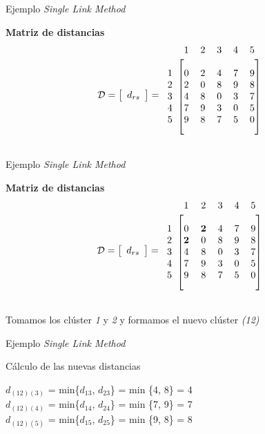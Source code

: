 \documentclass[spanish]{beamer}
\begin{document}
\begin{frame}{Ejemplo \textit{Single Link Method}}

	\textbf{Matriz de distancias}
	\[ \mathcal{D} =
	\left[ \begin{array}{c}
	d_{rs}
	\end{array} \right] =
	\begin{blockarray}{cccccc}
		& 1 & 2 & 3 & 4 & 5 \\
		\begin{block}{c[ccccc]}
			\\
			1 & 0 & 2 & 4 & 7 & 9 \\
			2 & 2 & 0 & 8 & 9 & 8 \\
			3 & 4 & 8 & 0 & 3 & 7 \\
			4 & 7 & 9 & 3 & 0 & 5 \\
			5 & 9 & 8 & 7 & 5 & 0 \\
			\\
		\end{block}
	\end{blockarray}  
	\] 

\end{frame}

\begin{frame}{Ejemplo \textit{Single Link Method}}

	\textbf{Matriz de distancias}
	\[ \mathcal{D} =
	\left[ \begin{array}{c}
	d_{rs}
	\end{array} \right] =
	\begin{blockarray}{cccccc}
		& 1 & 2 & 3 & 4 & 5 \\
		\begin{block}{c[ccccc]}
			\\
			1 & 0 & \textbf{2} & 4 & 7 & 9 \\
			2 & \textbf{2} & 0 & 8 & 9 & 8 \\
			3 & 4 & 8 & 0 & 3 & 7 \\
			4 & 7 & 9 & 3 & 0 & 5 \\
			5 & 9 & 8 & 7 & 5 & 0 \\
			\\
		\end{block}
	\end{blockarray}  
	\] 

 Tomamos los clúster \textit{1} y \textit{2} y formamos el nuevo clúster \textit{(12)}
\end{frame}

\begin{frame}{Ejemplo \textit{Single Link Method}}

	Cálculo de las nuevas distancias
	\begin{center}
	$d_{(12)(3)}$ = min\{$d_{13}$, $d_{23}$\} = min \{4, 8\} = 4\\
	$d_{(12)(4)}$ = min\{$d_{14}$, $d_{24}$\} = min \{7, 9\} = 7\\
	$d_{(12)(5)}$ = min\{$d_{15}$, $d_{25}$\} = min \{9, 8\} = 8\\
	\end{center}
\end{frame}
\end{document}
